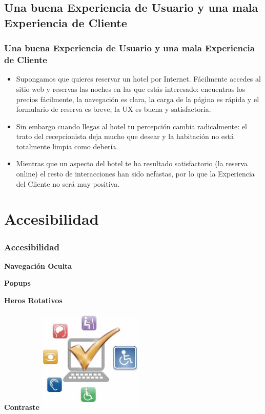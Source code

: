 \documentclass[11pt]{beamer}
\begin{document}
\subsection{Una buena Experiencia de Usuario y una mala Experiencia de Cliente}
\begin{frame}
\frametitle{Una buena Experiencia de Usuario y una mala Experiencia de Cliente}
\begin{itemize}
\item Supongamos que quieres reservar un hotel por Internet. Fácilmente accedes al sitio web y reservas las noches en las que estás interesado: encuentras los precios fácilmente, la navegación es clara, la carga de la página es rápida y el formulario de reserva es breve, la UX es buena y satisfactoria.
\item Sin embargo cuando llegas al hotel tu percepción cambia radicalmente: el trato del recepcionista deja mucho que desear y la habitación no está totalmente limpia como debería.
\item Mientras que un aspecto del hotel te ha resultado satisfactorio (la reserva online)  el resto de interacciones han sido nefastas, por lo que la Experiencia del Cliente no será muy positiva.
\end{itemize}
\end{frame}

\section{Accesibilidad}
\begin{frame}
\frametitle{Accesibilidad}
\begin{itemize}
\begin{multicols}{2}
\item \textbf{Navegación Oculta}
\item \textbf{Popups}
\item \textbf{Heros Rotativos}
\item \textbf{Contraste}
\columnbreak
\includegraphics[width=5.0cm,height=5.0cm]{img/accesibilidad.jpg}
\end{multicols}
\end{itemize}
\end{frame}
\end{document}
